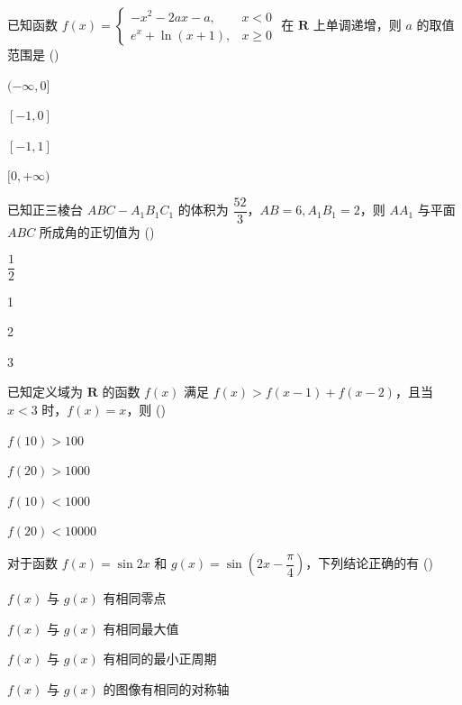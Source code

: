 \documentclass{exam-zh}
\begin{document}
\begin{question}
已知函数 $f(x)=\begin{cases}-x^2-2ax-a, & x<0 \\ e^x+\ln(x+1), & x\geqslant 0\end{cases}$ 在 $\mathbf{R}$ 上单调递增，则 $a$ 的取值范围是
(\hspace{1cm})
\begin{choices}
\item $(-\infty,0]$
\item $[-1,0]$
\item $[-1,1]$
\item $[0,+\infty)$
\end{choices}
\end{question}

\begin{question}
已知正三棱台 $ABC-A_1B_1C_1$ 的体积为 $\dfrac{52}{3}$，$AB=6, A_1B_1=2$，则 $AA_1$ 与平面 $ABC$ 所成角的正切值为
(\hspace{1cm})
\begin{choices}
\item $\dfrac{1}{2}$
\item 1
\item 2
\item 3
\end{choices}
\end{question}

\begin{question}
已知定义域为 $\mathbf{R}$ 的函数 $f(x)$ 满足 $f(x)>f(x-1)+f(x-2)$，且当 $x<3$ 时，$f(x)=x$，则
(\hspace{1cm})
\begin{choices}
\item $f(10)>100$
\item $f(20)>1000$
\item $f(10)<1000$
\item $f(20)<10000$
\end{choices}
\end{question}

\begin{question}
对于函数 $f(x)=\sin 2x$ 和 $g(x)=\sin\left(2x-\dfrac{\pi}{4}\right)$，下列结论正确的有
(\hspace{1cm})
\begin{choices}
\item $f(x)$ 与 $g(x)$ 有相同零点
\item $f(x)$ 与 $g(x)$ 有相同最大值
\item $f(x)$ 与 $g(x)$ 有相同的最小正周期
\item $f(x)$ 与 $g(x)$ 的图像有相同的对称轴
\end{choices}
\end{question}
\end{document}
